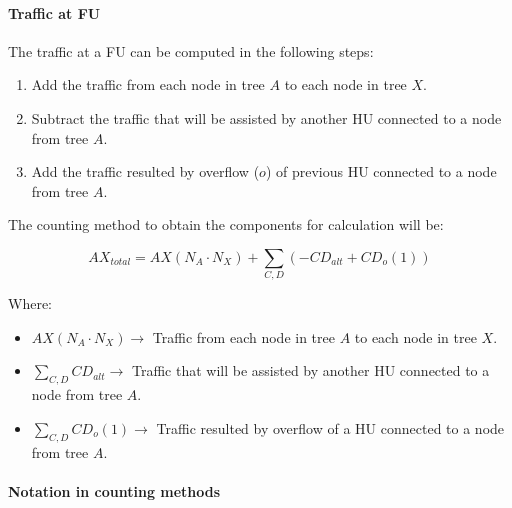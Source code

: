 \documentclass[
	12pt,
	twoside
]{book}
\begin{document}
\paragraph{Traffic at FU}

The traffic at a FU can be computed in the following steps:
\begin{enumerate}
	\item Add the traffic from each node in tree $A$ to each node in tree $X$.
	\item Subtract the traffic that will be assisted by another HU connected to a node from tree $A$.
	\item Add the traffic resulted by overflow ($o$) of previous HU connected to a node from tree $A$.
\end{enumerate}

The counting method to obtain the components for calculation will be:

$$
	AX_{total} = AX (N_A \cdot N_X) + \sum_{C, D} \left( - CD_{alt} + CD_o (1) \right)
$$

Where:

\begin{itemize}
	\item $AX (N_A \cdot N_X) \rightarrow$ Traffic from each node in tree $A$ to each node in tree $X$.
	\item $\sum_{C, D} CD_{alt} \rightarrow$ Traffic that will be assisted by another HU connected to a node from tree $A$.
	\item $\sum_{C, D} CD_o (1) \rightarrow$ Traffic resulted by overflow of a HU connected to a node from tree $A$.
\end{itemize}

\paragraph{Notation in counting methods}
\end{document}
